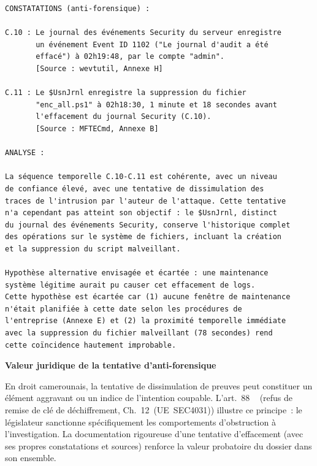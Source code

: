 \begin{lstlisting}[language=bash_forensique,
    caption={Exemple de constatation et analyse, tentative d'anti-forensique}]
CONSTATATIONS (anti-forensique) :

C.10 : Le journal des événements Security du serveur enregistre
       un événement Event ID 1102 ("Le journal d'audit a été
       effacé") à 02h19:48, par le compte "admin".
       [Source : wevtutil, Annexe H]

C.11 : Le $UsnJrnl enregistre la suppression du fichier
       "enc_all.ps1" à 02h18:30, 1 minute et 18 secondes avant
       l'effacement du journal Security (C.10).
       [Source : MFTECmd, Annexe B]

ANALYSE :

La séquence temporelle C.10-C.11 est cohérente, avec un niveau
de confiance élevé, avec une tentative de dissimulation des
traces de l'intrusion par l'auteur de l'attaque. Cette tentative
n'a cependant pas atteint son objectif : le $UsnJrnl, distinct
du journal des événements Security, conserve l'historique complet
des opérations sur le système de fichiers, incluant la création
et la suppression du script malveillant.

Hypothèse alternative envisagée et écartée : une maintenance
système légitime aurait pu causer cet effacement de logs.
Cette hypothèse est écartée car (1) aucune fenêtre de maintenance
n'était planifiée à cette date selon les procédures de
l'entreprise (Annexe E) et (2) la proximité temporelle immédiate
avec la suppression du fichier malveillant (78 secondes) rend
cette coïncidence hautement improbable.
\end{lstlisting}

\begin{boxjuris}
\textbf{Valeur juridique de la tentative d'anti-forensique}

En droit camerounais, la tentative de dissimulation de preuves
peut constituer un élément aggravant ou un indice de l'intention
coupable. L'art.~88 ~\cite{cameroun2010a} (refus de remise de clé de
déchiffrement, Ch.~12~(UE~SEC4031)) illustre ce principe~:
le législateur sanctionne spécifiquement les comportements
d'obstruction à l'investigation. La documentation rigoureuse
d'une tentative d'effacement (avec ses propres constatations
et sources) renforce la valeur probatoire du dossier dans
son ensemble.
\end{boxjuris}

\separateur


